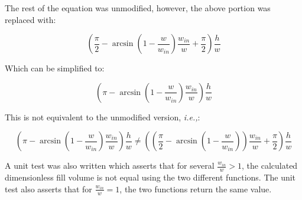 The rest of the equation was unmodified, however, the above portion was replaced with:

$$
\left(\frac{\pi}{2} -
\arcsin\left(1 - \frac{w}{w_{in}}\right)\frac{w_{in}}{w} +
\frac{\pi}{2}\right)\frac{h}{w}
$$

Which can be simplified to:

$$
\left(\pi -
\arcsin\left(1 - \frac{w}{w_{in}}\right)\frac{w_{in}}{w}
\right)\frac{h}{w}
$$

This is not equivalent to the unmodified version, \emph{i.e.,}:

$$
\left(\pi -
\arcsin\left(1 - \frac{w}{w_{in}}\right)\frac{w_{in}}{w}
\right)\frac{h}{w}
\neq
\left(\left(\frac{\pi}{2} -
\arcsin\left(1 - \frac{w}{w_{in}}\right)\right)\frac{w_{in}}{w} +
\frac{\pi}{2}\right)\frac{h}{w}
$$

A unit test was also written which asserts that for several $\frac{w_{in}}{w}>1$, the 
calculated dimensionless fill volume is not equal using the two different functions.
The unit test also asserts that for $\frac{w_{in}}{w}=1$, the two functions return
the same value.

